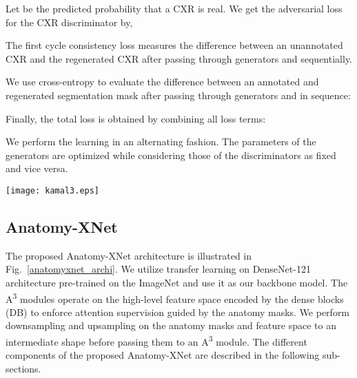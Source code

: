 \documentclass[journal]{IEEEtran}
\begin{document}
Let  be the predicted probability that a CXR  is real. We get the adversarial loss for the CXR discriminator by,

The first cycle consistency loss measures the difference between an unannotated CXR and the regenerated CXR after passing through generators  and  sequentially.

We use cross-entropy to evaluate the difference between an annotated and regenerated segmentation mask after passing through generators  and  in sequence:

Finally, the total loss is obtained by combining all loss terms:

We perform the learning in an alternating fashion. The parameters of the generators are optimized while considering those of the discriminators as fixed and vice versa.
\begin{figure*}[!t]
	\centering
	\texttt{[image: kamal3.eps]}
 	\caption{The architecture of the proposed Anatomy-XNet. The anatomy-aware attention (A\textsuperscript{3}) modules operate on the upsampled feature spaces from dense block-3 and dense block-4 with the help of downsampled anatomy masks. These anatomy masks are derived from the segmentation network in a semi-supervised manner. The feature spaces calibrated with the supervision of anatomy knowledge from each of the A\textsuperscript{3} modules are pooled by the PWAP layers and concatenated. The classifier module outputs pathology class scores by taking these concatenated pooled features as input.}
 	\label{anatomyxnet_archi}
\end{figure*}
\subsection{Anatomy-XNet}
The proposed Anatomy-XNet architecture is illustrated in Fig.~\ref{anatomyxnet_archi}. We utilize transfer learning on DenseNet-121 \cite{8099726} architecture pre-trained on the ImageNet and use it as our backbone model. The A\textsuperscript{3} modules operate on the high-level feature space encoded by the dense blocks (DB) to enforce attention supervision guided by the anatomy masks. We perform downsampling and upsampling on the anatomy masks and feature space to an intermediate shape before passing them to an A\textsuperscript{3} module. The different components of the proposed Anatomy-XNet are described in the following sub-sections.
\end{document}
